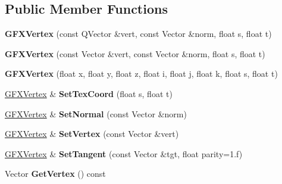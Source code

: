 \subsection*{Public Member Functions}
\begin{DoxyCompactItemize}
\item 
{\bfseries G\+F\+X\+Vertex} (const Q\+Vector \&vert, const Vector \&norm, float s, float t)\hypertarget{structGFXVertex_a4cb4af00ea2eb9ef561b0914219c1402}{}\label{structGFXVertex_a4cb4af00ea2eb9ef561b0914219c1402}

\item 
{\bfseries G\+F\+X\+Vertex} (const Vector \&vert, const Vector \&norm, float s, float t)\hypertarget{structGFXVertex_a64179a4ffca6b7835a93b5ed9788b74d}{}\label{structGFXVertex_a64179a4ffca6b7835a93b5ed9788b74d}

\item 
{\bfseries G\+F\+X\+Vertex} (float x, float y, float z, float i, float j, float k, float s, float t)\hypertarget{structGFXVertex_aad80fdf078cb59343eee1baa478c052c}{}\label{structGFXVertex_aad80fdf078cb59343eee1baa478c052c}

\item 
\hyperlink{structGFXVertex}{G\+F\+X\+Vertex} \& {\bfseries Set\+Tex\+Coord} (float s, float t)\hypertarget{structGFXVertex_a30236eb6fbb17f9587c815a3f1e5c01f}{}\label{structGFXVertex_a30236eb6fbb17f9587c815a3f1e5c01f}

\item 
\hyperlink{structGFXVertex}{G\+F\+X\+Vertex} \& {\bfseries Set\+Normal} (const Vector \&norm)\hypertarget{structGFXVertex_a893537687bd89e16da91f9c54c2f210b}{}\label{structGFXVertex_a893537687bd89e16da91f9c54c2f210b}

\item 
\hyperlink{structGFXVertex}{G\+F\+X\+Vertex} \& {\bfseries Set\+Vertex} (const Vector \&vert)\hypertarget{structGFXVertex_a0d5b989eb01869fda1121ade33ddccfa}{}\label{structGFXVertex_a0d5b989eb01869fda1121ade33ddccfa}

\item 
\hyperlink{structGFXVertex}{G\+F\+X\+Vertex} \& {\bfseries Set\+Tangent} (const Vector \&tgt, float parity=1.f)\hypertarget{structGFXVertex_ab6193e794ed00601a8822824d930b9b2}{}\label{structGFXVertex_ab6193e794ed00601a8822824d930b9b2}

\item 
Vector {\bfseries Get\+Vertex} () const \hypertarget{structGFXVertex_a70331ce6d7a3db37fdf0729740cbf88e}{}\label{structGFXVertex_a70331ce6d7a3db37fdf0729740cbf88e}


\end{DoxyCompactItemize}
